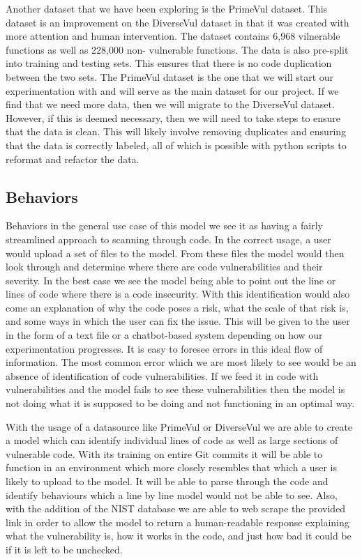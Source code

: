 \documentclass{article}
\begin{document}
Another dataset that we have been exploring is the PrimeVul \cite{ding2024vulnerabilitydetectioncodelanguage} dataset. This dataset is an 
improvement on the DiverseVul dataset in that it was created with more attention and human
intervention. The dataset contains 6,968 vilnerable functions as well as 228,000 non-
vulnerable functions. The data is also pre-split into training and testing sets. This ensures
that there is no code duplication between the two sets. The PrimeVul dataset is the one that
we will start our experimentation with and will serve as the main dataset for our project.
If we find that we need more data, then we will migrate to the DiverseVul dataset. However,
if this is deemed necessary, then we will need to take steps to ensure that the data is clean.
This will likely involve removing duplicates and ensuring that the data is correctly labeled,
all of which is possible with python scripts to reformat and refactor the data. 

\subsection{Behaviors}
Behaviors
in the general use case of this model we see it as having a fairly streamlined approach to scanning through code. In the correct usage, a user would upload a set of files to the model. From these files the model would then look through and determine where there are code vulnerabilities and their severity. In the best case we see the model being able to point out the line or lines of code where there is a code insecurity. With this identification would also come an explanation of why the code poses a risk, what the scale of that risk is, and some ways in which the user can fix the issue. This will be given to the user in the form of a text file or a chatbot-based system depending on how our experimentation progresses. 
It is easy to foresee errors in this ideal flow of information. The most common error which we are most likely to see would be an absence of identification of code vulnerabilities. If we feed it in code with vulnerabilities and the model fails to see these vulnerabilities then the model is not doing what it is supposed to be doing and not functioning in an optimal way. 

With the usage of a datasource like PrimeVul or DiverseVul we are able to create a model which can identify individual lines of code as well as large sections of vulnerable code. With its training on entire Git commits it will be able to function in an environment which more closely resembles that which a user is likely to upload to the model. It will be able to parse through the code and identify behaviours which a line by line model would not be able to see. Also, with the addition of the NIST database we are able to web scrape the provided link in order to allow the model to return a human-readable response explaining what the vulnerability is, how it works in the code, and just how bad it could be if it is left to be unchecked. 
\end{document}

